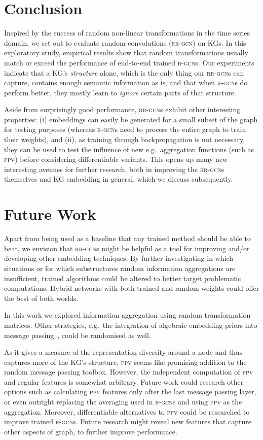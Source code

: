 \documentclass{llncs}
\begin{document}
\section{Conclusion} \label{sec:conclusion}
Inspired by the success of random non-linear transformations in the time series domain, we set out to evaluate random convolutions (\textsc{rr-gcn}) on KGs. In this exploratory study, empirical results show that random transformations usually match or exceed the performance of end-to-end trained \textsc{r-gcn}s. 
Our experiments indicate that a KG's \textit{structure} alone, which is the only thing our \textsc{rr-gcn}s can capture, contains enough semantic information as is, and that when \textsc{r-gcn}s do perform better, they mostly learn to \textit{ignore} certain parts of that structure.

Aside from surprisingly good performance, \textsc{rr-gcn}s exhibit other interesting properties: (i) embeddings can easily be generated for a small subset of the graph for testing purposes (whereas \textsc{r-gcn}s need to process the entire graph to train their weights), and (ii), as training through backpropagation is not necessary, they can be used to test the influence of new e.g.~aggregation functions (such as \textsc{ppv}) before considering differentiable variants. This opens up many new interesting avenues for further research, both in improving the \textsc{rr-gcn}s themselves and KG embedding in general, which we discuss subsequently.

\section{Future Work}
\label{sec:futurework}
Apart from being used as a baseline that any trained method should be able to beat, we envision that \textsc{rr-gcn}s might be helpful as a tool for improving and/or developing other embedding techniques. By further investigating in which situations or for which substructures random information aggregations are insufficient, trained algorithms could be altered to better target problematic computations. Hybrid networks with both trained and random weights could offer the best of both worlds.

In this work we explored information aggregation using random transformation matrices. Other strategies, e.g.~the integration of algebraic embedding priors into message passing~\cite{2019transgcn,compgcn}, could be randomised as well.

As it gives a measure of the representation diversity around a node and thus captures more of the KG's structure, \textsc{ppv} seems like promising addition to the random message passing toolbox. However, the independent computation of \textsc{ppv} and regular features is somewhat arbitrary. Future work could research other options such as calculating \textsc{ppv} features only after the last message passing layer, or even outright replacing the averaging used in \textsc{r-gcn}s and using \textsc{ppv} as the aggregation. Moreover, differentiable alternatives to \textsc{ppv} could be researched to improve trained \textsc{r-gcn}s.
Future research might reveal new features that capture other aspects of graph, to further improve performance.
\end{document}

